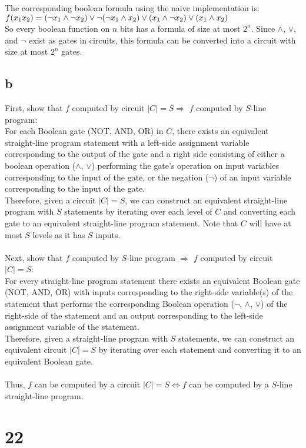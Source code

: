 \documentclass[letterpaper,notitlepage,twoside]{article}
\begin{document}
The corresponding boolean formula using the naive implementation is:
$f(x_1x_2) = (\neg x_1 \land \neg x_2) \lor \\
\neg(\neg x_1 \land x_2) \lor \\
(x_1 \land \neg x_2) \lor \\
(x_1 \land x_2)$ \\

So every boolean function on $n$ bits has a formula of size at most $2^n$.
Since $\land$, $\lor$, and $\neg$ exist as gates in circuits, this formula can be converted into a circuit with size at most $2^n$ gates.

\subsection*{b}
First, show that $f$ computed by circuit $|C| = S \Rightarrow$ $f$ computed by $S$-line program: \\
For each Boolean gate (NOT, AND, OR) in $C$, there exists an equivalent straight-line program statement with a left-side assignment variable corresponding to the output of the gate and a right side consisting of either a boolean operation ($\land$, $\lor$) performing the gate's operation on input variables corresponding to the input of the gate, or the negation ($\neg$) of an input variable corresponding to the input of the gate. \\
Therefore, given a circuit $|C| = S$, we can construct an equivalent straight-line program with $S$ statements by iterating over each level of $C$ and converting each gate to an equivalent straight-line program statement. Note that $C$ will have at most $S$ levels as it has $S$ inputs. \\ \\
Next, show that $f$ computed by $S$-line program $\Rightarrow$ $f$ computed by circuit $|C| = S$: \\
For every straight-line program statement there exists an equivalent Boolean gate (NOT, AND, OR) with inputs corresponding to the right-side variable(s) of the statement that performs the corresponding Boolean operation ($\neg$, $\land$, $\lor$) of the right-side of the statement and an output corresponding to the left-side assignment variable of the statement. \\
Therefore, given a straight-line program with $S$ statements, we can construct an equivalent circuit $|C| = S$ by iterating over each statement and converting it to an equivalent Boolean gate. \\ \\
Thus, $f$ can be computed by a circuit $|C| = S \Leftrightarrow f$ can be computed by a $S$-line straight-line program.

\section*{22}
\end{document}
